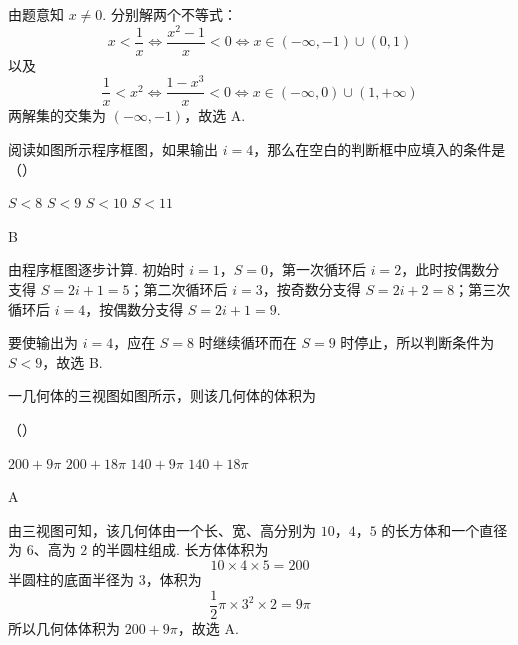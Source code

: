 \begin{solution}
由题意知 \(x\ne0\). 分别解两个不等式：
\[
x<\frac{1}{x}
\iff \frac{x^{2}-1}{x}<0
\iff x\in(-\infty,-1)\cup(0,1)
\]
以及
\[
\frac{1}{x}<x^{2}
\iff \frac{1-x^{3}}{x}<0
\iff x\in(-\infty,0)\cup(1,+\infty)
\]
两解集的交集为 \((-\infty,-1)\)，故选 A.
\end{solution}

\begin{problem}
阅读如图所示程序框图，如果输出 \(i = 4\)，那么在空白的判断框中应填入的条件是（\quad）

\FloatBarrier

\choices
    {\(S < 8\)}
    {\(S < 9\)}
    {\(S < 10\)}
    {\(S < 11\)}
\end{problem}

\begin{answer}
B
\end{answer}

\begin{solution}
由程序框图逐步计算. 初始时 \(i=1\)，\(S=0\)，第一次循环后 \(i=2\)，此时按偶数分支得 \(S=2i+1=5\)；第二次循环后 \(i=3\)，按奇数分支得 \(S=2i+2=8\)；第三次循环后 \(i=4\)，按偶数分支得 \(S=2i+1=9\).

要使输出为 \(i=4\)，应在 \(S=8\) 时继续循环而在 \(S=9\) 时停止，所以判断条件为 \(S<9\)，故选 B.
\end{solution}

\begin{problem}
一几何体的三视图如图所示，则该几何体的体积为


\FloatBarrier

（\quad）

\choices
    {\(200 + 9\pi\)}
    {\(200 + 18\pi\)}
    {\(140 + 9\pi\)}
    {\(140 + 18\pi\)}
\end{problem}

\begin{answer}
A
\end{answer}

\begin{solution}
由三视图可知，该几何体由一个长、宽、高分别为 \(10\)，\(4\)，\(5\) 的长方体和一个直径为 \(6\)、高为 \(2\) 的半圆柱组成. 长方体体积为
\[
10\times4\times5=200
\]
半圆柱的底面半径为 \(3\)，体积为
\[
\frac{1}{2}\pi\times3^{2}\times2=9\pi
\]
所以几何体体积为 \(200+9\pi\)，故选 A.
\end{solution}

